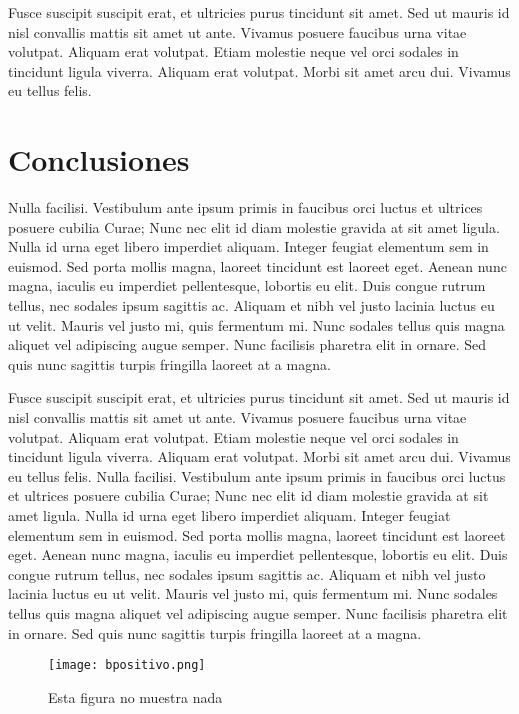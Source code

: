 \documentclass[twocolumn,a4paper,10pt]{article}
\begin{document}
Fusce suscipit suscipit erat, et ultricies purus tincidunt sit amet. Sed ut mauris id nisl convallis mattis sit amet ut ante. Vivamus posuere faucibus urna vitae volutpat. Aliquam erat volutpat. Etiam molestie neque vel orci sodales in tincidunt ligula viverra. Aliquam erat volutpat. Morbi sit amet arcu dui. Vivamus eu tellus felis.

\section{Conclusiones}
Nulla facilisi. Vestibulum ante ipsum primis in faucibus orci luctus et ultrices posuere cubilia Curae; Nunc nec elit id diam molestie gravida at sit amet ligula. Nulla id urna eget libero imperdiet aliquam. Integer feugiat elementum sem in euismod. Sed porta mollis magna, laoreet tincidunt est laoreet eget. Aenean nunc magna, iaculis eu imperdiet pellentesque, lobortis eu elit. Duis congue rutrum tellus, nec sodales ipsum sagittis ac. Aliquam et nibh vel justo lacinia luctus eu ut velit. Mauris vel justo mi, quis fermentum mi. Nunc sodales tellus quis magna aliquet vel adipiscing augue semper. Nunc facilisis pharetra elit in ornare. Sed quis nunc sagittis turpis fringilla laoreet at a magna.

Fusce suscipit suscipit erat, et ultricies purus tincidunt sit amet. Sed ut mauris id nisl convallis mattis sit amet ut ante. Vivamus posuere faucibus urna vitae volutpat. Aliquam erat volutpat. Etiam molestie neque vel orci sodales in tincidunt ligula viverra. Aliquam erat volutpat. Morbi sit amet arcu dui. Vivamus eu tellus felis.
Nulla facilisi. Vestibulum ante ipsum primis in faucibus orci luctus et ultrices posuere cubilia Curae; Nunc nec elit id diam molestie gravida at sit amet ligula. Nulla id urna eget libero imperdiet aliquam. Integer feugiat elementum sem in euismod. Sed porta mollis magna, laoreet tincidunt est laoreet eget. Aenean nunc magna, iaculis eu imperdiet pellentesque, lobortis eu elit. Duis congue rutrum tellus, nec sodales ipsum sagittis ac. Aliquam et nibh vel justo lacinia luctus eu ut velit. Mauris vel justo mi, quis fermentum mi. Nunc sodales tellus quis magna aliquet vel adipiscing augue semper. Nunc facilisis pharetra elit in ornare. Sed quis nunc sagittis turpis fringilla laoreet at a magna.
\begin{figure}
    \center \texttt{[image: bpositivo.png]}
    \caption{Esta figura no muestra nada}
\end{figure}
\end{document}
